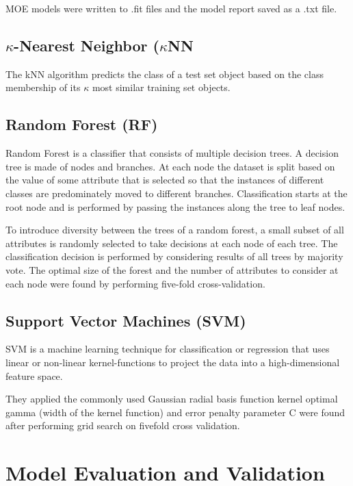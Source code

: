 MOE models were written to .fit files and the model report saved as a .txt file.

\subsection{$\kappa$-Nearest Neighbor ($\kappa$NN}
The kNN algorithm predicts the class of a test set object based on the class membership of its $\kappa$ most similar training set objects. \cite{Lapins2013}

\subsection{Random Forest (RF)}
Random Forest is a classifier that consists of multiple decision trees. A decision tree is made of nodes and branches. At each node the dataset is split based on the value of some attribute that is selected so that the instances of different classes are predominately moved to different branches. Classification starts at the root node and is performed by passing the instances along the tree to leaf nodes. \cite{Lapins2013}

To introduce diversity between the trees of a random forest, a small subset of all attributes is randomly selected to take decisions at each node of each tree. The classification decision is performed by considering results of all trees by majority vote. The optimal size of the forest and the number of attributes to consider at each node were found by performing five-fold cross-validation. \cite{Lapins2013}

\subsection{Support Vector Machines (SVM)}
SVM is a machine learning technique for classification or regression that uses linear or non-linear kernel-functions to project the data into a high-dimensional feature space. \cite{Lapins2013}


They applied the commonly used Gaussian radial basis function kernel optimal gamma (width of the kernel function) and error penalty parameter C were found after performing grid search on five­fold cross validation. \cite{Lapins2013}


\section{Model Evaluation and Validation}

